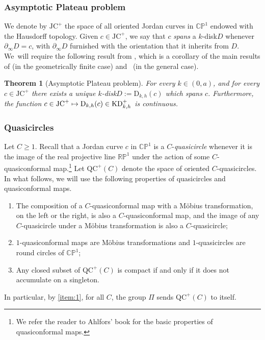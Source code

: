 \documentclass[11pt]{article}
\newcommand\mto{\mathchoice{\longmapsto}{\mapsto}{\mapsto}{\mapsto}}
\newcommand{\kdisk}{$k$\nobreakdash-disk\xspace}
\theoremstyle{plain}
\newtheorem{theorem}{Theorem}[section]
\theoremstyle{definition}
\newcommand\CP{\C\PP^1}
\newcommand\RP{\R\PP^1}
\newcommand{\R}{{\mathbb R}}
\newcommand{\C}{{\mathbb C}}
\newcommand{\PP}{{\mathbb P}}
\newcommand{\QC}{\mathrm{QC}}
\newcommand{\KD}{\mathrm{KD}}
\newcommand{\JC}{\mathrm{JC}}
\newcommand{\rD}{\mathrm{D}}
\newcommand{\bord}{\partial_{\infty}}
\begin{document}
\subsubsection{Asymptotic Plateau problem}\label{sss.asymptotic_Plateau_problem} We denote by $\JC^+$ the space of all oriented Jordan curves in $\CP$ endowed with the Hausdorff topology. Given $c\in\JC^+$, we say that $c$ \emph{spans} a \kdisk $D$ whenever $\bord D=c$, with $\bord D$ furnished with the orientation that it inherits from $D$. We~will require the following result from \cite[Th.\,\&\,Def.\,2.1.1]{ALS}, which is a corollary of the main results of \cite{LabourieInvent} (in the geometrically finite case) and~\cite{Smith_asymp} (in the general case).

\begin{theorem}[Asymptotic Plateau problem]\label{th.As_plateau_problem}
For every $k\in(0,a)$, and for every $c\in\JC^+$ there exists a unique \kdisk $D:=\rD_{k,h}(c)$ which spans $c$. Furthermore, the function $c\in\JC^+\mto\rD_{k,h}(c)\in\KD^+_{k,h}$ is continuous.
\end{theorem}

\subsubsection{Quasicircles}\label{sss.PSL_quasicircles} Let $C\geq 1$. Recall that a Jordan curve $c$ in $\CP$ is a $C$\nobreakdash-\emph{quasicircle} whenever it is the image of the real projective line $\RP$ under the action of some $C$-quasiconformal map.\footnote{We refer the reader to Ahlfors' book \cite{Ahlfors} for the basic properties of quasiconformal maps.} Let $\QC^+(C)$ denote the space of oriented $C$-quasicircles. In what follows, we will use the following properties of quasicircles and quasiconformal maps.
\begin{enumerate}
\item\label{item:1} The composition of a $C$-quasiconformal map with a Möbius transformation, on the left or the right, is also a $C$-quasiconformal map, and the image of any $C$\nobreakdash-quasi\-circle under a Möbius transformation is also a $C$-quasicircle;
\item $1$-quasiconformal maps are Möbius transformations and $1$-quasicircles are round circles of $\CP$;
\item\label{item:3} Any closed subset of $\QC^+(C)$ is compact if and only if it does not accumulate on a singleton.
\end{enumerate}
In particular, by \eqref{item:1}, for all $C$, the group $\Pi$ sends $\QC^+(C)$ to itself.
\end{document}
